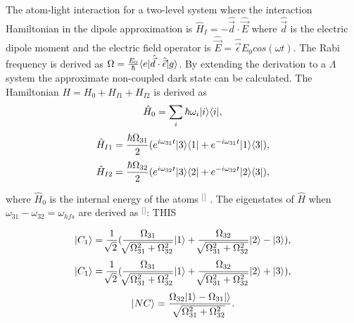 The atom-light interaction for a two-level system where the interaction Hamiltonian in the dipole approximation is $\hat{H}_{I}=-\hat{\vec{d}}\cdot\hat{\vec{E}}$ where $\hat{\vec{d}}$ is the electric dipole moment and the electric field operator is $\hat{\vec{E}}=\hat{\vec{\epsilon}}E_{0}cos(\omega t)$. The Rabi frequency is derived as $\Omega=\frac{E_{0}}{\hbar}\langle e\rvert\hat{\vec{d}}\cdot\hat{\vec{\epsilon}}\lvert g\rangle$. By extending the derivation to a $\Lambda$ system the approximate non-coupled dark state can be calculated. The Hamiltonian $H=H_{0}+H_{I1}+H_{I2}$ is derived as 
\begin{equation}
\label{eq:interactionham0}
\hat{H}_{0}=\sum_{i}\hbar\omega_{i}\lvert i\rangle\langle i\rvert,
\end{equation}
\begin{equation}
\label{eq:interactionham1}
\hat{H}_{I1}=\frac{\hbar\Omega_{31}}{2}(e^{i\omega_{31}t}\lvert3\rangle\langle1\rvert+e^{-i\omega_{31}t}\lvert1\rangle\langle3\rvert),
\end{equation}
\begin{equation}
\label{eq:interactionham2}
\hat{H}_{I2}=\frac{\hbar\Omega_{32}}{2}(e^{i\omega_{32}t}\lvert3\rangle\langle2\rvert+e^{-i\omega_{32}t}\lvert2\rangle\langle3\rvert),
\end{equation}


where $\hat{H}_{0}$ is the internal energy of the atoms $^[$\citep{Purves2006AbsorptionInterferometery}$^]$ . The eigenstates of $\hat{H}$ when $\omega_{31}-\omega_{32}=\omega_{hfs}$ are derived as $^[$\citep{Purves2006AbsorptionInterferometery}$^]$: THIS

\begin{equation}
\label{eq:CPTstatesC1}
\lvert C_{1}\rangle=\frac{1}{\sqrt[]{2}}(\frac{\Omega_{31}}{\sqrt[]{\Omega_{31}^{2}+\Omega_{32}^{2}}}\lvert1\rangle+\frac{\Omega_{32}}{\sqrt[]{\Omega_{31}^{2}+\Omega_{32}^{2}}}\lvert2\rangle-\lvert3\rangle),
\end{equation}
\begin{equation}
\label{eq:CPTstatesC2}
\lvert C_{1}\rangle=\frac{1}{\sqrt[]{2}}(\frac{\Omega_{31}}{\sqrt[]{\Omega_{31}^{2}+\Omega_{32}^{2}}}\lvert1\rangle+\frac{\Omega_{32}}{\sqrt[]{\Omega_{31}^{2}+\Omega_{32}^{2}}}\lvert2\rangle+\lvert3\rangle),
\end{equation}
\begin{equation}
\label{eq:CPTstatesNC}
\ket{NC}=\frac{\Omega_{32}\ket{1}-\Omega_{31}\ket}{\sqrt[]{\Omega_{31}^{2}+\Omega_{32}^{2}}}.
\end{equation}

